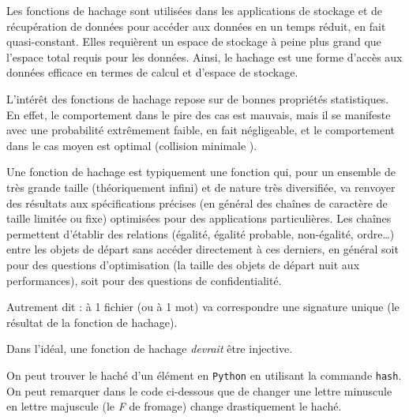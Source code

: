 \documentclass[
  letterpaper,
]{scrbook}
\theoremstyle{plain}
\theoremstyle{definition}
\theoremstyle{definition}
\theoremstyle{remark}
\begin{document}
Les fonctions de hachage sont utilisées dans les applications de
stockage et de récupération de données pour accéder aux données en un
temps réduit, en fait quasi-constant. Elles requièrent un espace de
stockage à peine plus grand que l'espace total requis pour les données.
Ainsi, le hachage est une forme d'accès aux données efficace en termes
de calcul et d'espace de stockage.

L'intérêt des fonctions de hachage repose sur de bonnes propriétés
statistiques. En effet, le comportement dans le pire des cas est
mauvais, mais il se manifeste avec une probabilité extrêmement faible,
en fait négligeable, et le comportement dans le cas moyen est optimal
(collision minimale ).

Une fonction de hachage est typiquement une fonction qui, pour un
ensemble de très grande taille (théoriquement infini) et de nature très
diversifiée, va renvoyer des résultats aux spécifications précises (en
général des chaînes de caractère de taille limitée ou fixe) optimisées
pour des applications particulières. Les chaînes permettent d'établir
des relations (égalité, égalité probable, non-égalité, ordre\ldots)
entre les objets de départ sans accéder directement à ces derniers, en
général soit pour des questions d'optimisation (la taille des objets de
départ nuit aux performances), soit pour des questions de
confidentialité.

Autrement dit : à 1 fichier (ou à 1 mot) va correspondre une signature
unique (le résultat de la fonction de hachage).

\begin{tcolorbox}[enhanced jigsaw, colbacktitle=quarto-callout-important-color!10!white, toptitle=1mm, left=2mm, toprule=.15mm, opacityback=0, bottomrule=.15mm, breakable, coltitle=black, title=\textcolor{quarto-callout-important-color}{\faExclamation}\hspace{0.5em}{Important}, colframe=quarto-callout-important-color-frame, arc=.35mm, titlerule=0mm, rightrule=.15mm, opacitybacktitle=0.6, leftrule=.75mm, bottomtitle=1mm, colback=white]

Dans l'idéal, une fonction de hachage \emph{devrait} être injective.

\end{tcolorbox}

On peut trouver le haché d'un élément en \texttt{Python} en utilisant la
commande \texttt{hash}. On peut remarquer dans le code ci-dessous que de
changer une lettre minuscule en lettre majuscule (le \emph{F} de
fromage) change drastiquement le haché.
\end{document}
